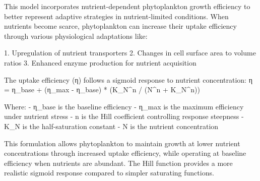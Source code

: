 This model incorporates nutrient-dependent phytoplankton growth efficiency to better represent adaptive strategies in nutrient-limited conditions. When nutrients become scarce, phytoplankton can increase their uptake efficiency through various physiological adaptations like:

1. Upregulation of nutrient transporters
2. Changes in cell surface area to volume ratios
3. Enhanced enzyme production for nutrient acquisition

The uptake efficiency (η) follows a sigmoid response to nutrient concentration:
η = η_base + (η_max - η_base) * (K_N^n / (N^n + K_N^n))

Where:
- η_base is the baseline efficiency
- η_max is the maximum efficiency under nutrient stress
- n is the Hill coefficient controlling response steepness
- K_N is the half-saturation constant
- N is the nutrient concentration

This formulation allows phytoplankton to maintain growth at lower nutrient concentrations through increased uptake efficiency, while operating at baseline efficiency when nutrients are abundant. The Hill function provides a more realistic sigmoid response compared to simpler saturating functions.
